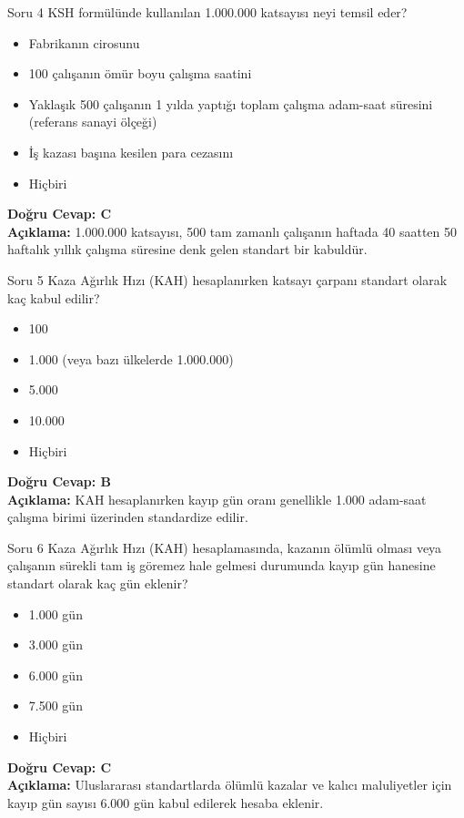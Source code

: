 \documentclass[12pt,a4paper]{article}
\begin{document}
\begin{testcard}{Soru 4}
    KSH formülünde kullanılan 1.000.000 katsayısı neyi temsil eder?
    \begin{itemize}
        \item[A)] Fabrikanın cirosunu
        \item[B)] 100 çalışanın ömür boyu çalışma saatini
        \item[C)] Yaklaşık 500 çalışanın 1 yılda yaptığı toplam çalışma adam-saat süresini (referans sanayi ölçeği)
        \item[D)] İş kazası başına kesilen para cezasını
        \item[E)] Hiçbiri
    \end{itemize}
    \tcblower
    \textbf{Doğru Cevap: C} \\
    \textbf{Açıklama:} 1.000.000 katsayısı, 500 tam zamanlı çalışanın haftada 40 saatten 50 haftalık yıllık çalışma süresine denk gelen standart bir kabuldür.
\end{testcard}

\begin{testcard}{Soru 5}
    Kaza Ağırlık Hızı (KAH) hesaplanırken katsayı çarpanı standart olarak kaç kabul edilir?
    \begin{itemize}
        \item[A)] 100
        \item[B)] 1.000 (veya bazı ülkelerde 1.000.000)
        \item[C)] 5.000
        \item[D)] 10.000
        \item[E)] Hiçbiri
    \end{itemize}
    \tcblower
    \textbf{Doğru Cevap: B} \\
    \textbf{Açıklama:} KAH hesaplanırken kayıp gün oranı genellikle 1.000 adam-saat çalışma birimi üzerinden standardize edilir.
\end{testcard}

\begin{testcard}{Soru 6}
    Kaza Ağırlık Hızı (KAH) hesaplamasında, kazanın ölümlü olması veya çalışanın sürekli tam iş göremez hale gelmesi durumunda kayıp gün hanesine standart olarak kaç gün eklenir?
    \begin{itemize}
        \item[A)] 1.000 gün
        \item[B)] 3.000 gün
        \item[C)] 6.000 gün
        \item[D)] 7.500 gün
        \item[E)] Hiçbiri
    \end{itemize}
    \tcblower
    \textbf{Doğru Cevap: C} \\
    \textbf{Açıklama:} Uluslararası standartlarda ölümlü kazalar ve kalıcı maluliyetler için kayıp gün sayısı 6.000 gün kabul edilerek hesaba eklenir.
\end{testcard}
\end{document}
